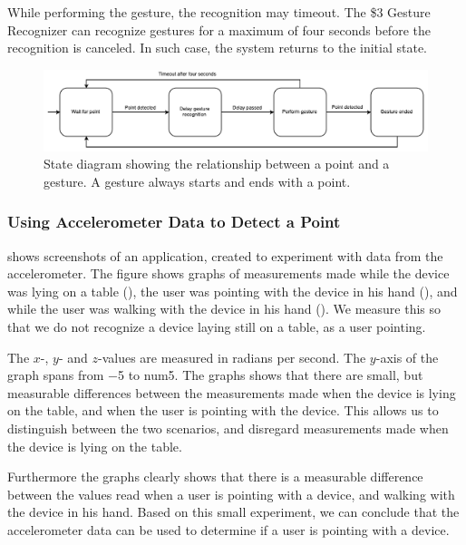 While performing the gesture, the recognition may timeout. 
The \$3 Gesture Recognizer can recognize gestures for a maximum of four seconds before the recognition is canceled. 
In such case, the system returns to the initial state.

\begin{figure}[h]
\centering
\includegraphics[width=\textwidth]{images/point-to-gesture-state-diagram}
\caption{State diagram showing the relationship between a point and a gesture. A gesture always starts and ends with a point.}
\label{fig:gesture-recognition:point-to-gesture-state-diagram}
\end{figure}

\subsubsection{Using Accelerometer Data to Detect a Point}

 shows screenshots of an application, 
created to experiment with data from the accelerometer. 
The figure shows graphs of measurements made while the device was lying on a table (), 
the user was pointing with the device in his hand (), 
and while the user was walking with the device in his hand ().
We measure this so that we do not recognize a device laying still on a table, 
as a user pointing.
 
The $x$-, $y$- and $z$-values are measured in radians per second. 
The $y$-axis of the graph spans from \num{-5} to num{5}. 
The graphs shows that there are small, 
but measurable differences between the measurements made when the device is lying on the table,
and when the user is pointing with the device. 
This allows us to distinguish between the two scenarios, 
and disregard measurements made when the device is lying on the table. 

Furthermore the graphs clearly shows that there is a measurable difference between the values read when a user is pointing with a device, 
and walking with the device in his hand. 
Based on this small experiment, 
we can conclude that the accelerometer data can be used to determine if a user is pointing with a device.

